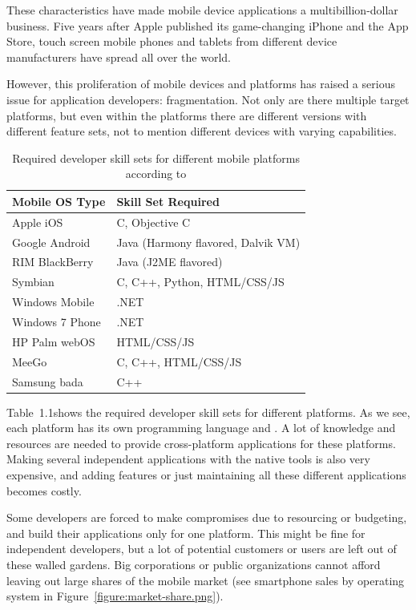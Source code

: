 These characteristics have made mobile device applications a
multibillion-dollar business. Five years after Apple published its
game-changing iPhone and the App Store, touch screen mobile phones and
tablets from different device manufacturers have spread all over the
world. \cite{cortimiglia2011mobile, charland2011mobile,
  fling2009mobile}

However, this proliferation of mobile devices and platforms has raised
a serious issue for application developers: fragmentation. Not only
are there multiple target platforms, but even within the platforms
there are different versions with different feature sets, not to
mention different devices with varying
capabilities. \cite{charland2011mobile}

\begin{table}
  \begin{tabular}{ l | l }
    \textbf{Mobile OS Type} & \textbf{Skill Set Required} \\
    \hline
    Apple iOS & C, Objective C \\
    Google Android & Java (Harmony flavored, Dalvik VM) \\
    RIM BlackBerry & Java (J2ME flavored) \\
    Symbian & C, C++, Python, HTML/CSS/JS \\
    Windows Mobile & .NET \\
    Windows 7 Phone & .NET \\
    HP Palm webOS & HTML/CSS/JS \\
    MeeGo & C, C++, HTML/CSS/JS \\
    Samsung bada & C++
  \end{tabular}
  \label{table:native-skills}
  \caption{Required developer skill sets for different mobile
    platforms according to \cite{charland2011mobile}}
\end{table}

Table~1.1\tablerefs shows the required developer skill sets for
different platforms. As we see, each platform has its own programming
language and . A lot of knowledge and resources are needed
to provide cross-platform applications for these platforms. Making
several independent applications with the native tools is also very
expensive, and adding features or just maintaining all these different
applications becomes costly. \cite{charland2011mobile}

Some developers are forced to make compromises due to resourcing or
budgeting, and build their applications only for one platform. This
might be fine for independent developers, but a lot of potential
customers or users are left out of these walled gardens. Big
corporations or public organizations cannot afford leaving out large
shares of the mobile market (see smartphone sales by operating system
in Figure~\ref{figure:market-share.png}). \cite{berners2010long}

